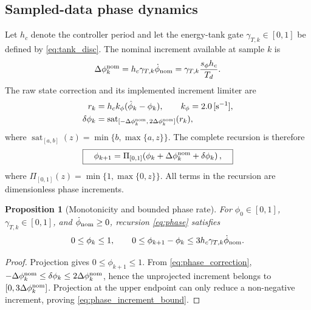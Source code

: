 \documentclass[11pt,a4paper]{article}
\newtheorem{proposition}{Proposition}
\newcommand{\unit}[1]{\,[\mathrm{#1}]}
\begin{document}
\subsection{Sampled-data phase dynamics}
Let $h_c$ denote the controller period and let the energy-tank gate
$\gamma_{T,k}\in[0,1]$ be defined by \eqref{eq:tank_disc}.  The nominal
increment available at sample $k$ is
\begin{equation}
\Delta\phi_k^{\rm nom}
=h_c\gamma_{T,k}\dot\phi_{\rm nom}
=\gamma_{T,k}\frac{s_\phi h_c}{T_d}.
\label{eq:nominal_phase_increment}
\end{equation}
The raw state correction and its implemented increment limiter are
\begin{align}
r_k&=h_c k_\phi(\hat\phi_k-\phi_k),
\qquad k_\phi=2.0\unit{s^{-1}},\\
\delta\phi_k
&=\operatorname{sat}_{[-\Delta\phi_k^{\rm nom},
\,2\Delta\phi_k^{\rm nom}]}(r_k),
\label{eq:phase_correction}
\end{align}
where
$\operatorname{sat}_{[a,b]}(z)=\min\{b,\max\{a,z\}\}$.
The complete recursion is therefore
\begin{equation}
\boxed{\quad
\phi_{k+1}
=\Pi_{[0,1]}\!\left(
\phi_k+\Delta\phi_k^{\rm nom}+\delta\phi_k
\right),\quad}
\label{eq:phase}
\end{equation}
where $\Pi_{[0,1]}(z)=\min\{1,\max\{0,z\}\}$.  All terms in the recursion are
dimensionless phase increments.

\begin{proposition}[Monotonicity and bounded phase rate]
\label{prop:phase_monotonicity}
For $\phi_0\in[0,1]$, $\gamma_{T,k}\in[0,1]$, and
$\dot\phi_{\rm nom}\geq0$, recursion \eqref{eq:phase} satisfies
\begin{equation}
0\leq\phi_k\leq1,\qquad
0\leq\phi_{k+1}-\phi_k
\leq3h_c\gamma_{T,k}\dot\phi_{\rm nom}.
\label{eq:phase_increment_bound}
\end{equation}
\end{proposition}
\begin{proof}
Projection gives $0\leq\phi_{k+1}\leq1$.  From
\eqref{eq:phase_correction},
$-\Delta\phi_k^{\rm nom}\leq\delta\phi_k
\leq2\Delta\phi_k^{\rm nom}$, hence the unprojected increment belongs to
$[0,3\Delta\phi_k^{\rm nom}]$.  Projection at the upper endpoint can only
reduce a non-negative increment, proving \eqref{eq:phase_increment_bound}.
\end{proof}
\end{document}
